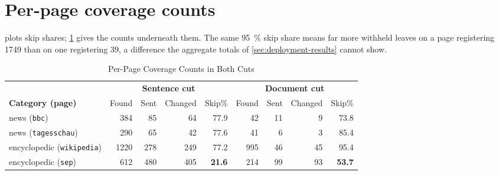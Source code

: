\section{Per-page coverage counts}
\label{app:coverage}

 plots skip shares; \cref{tab:coverage} gives the counts underneath them.
The same \qty{95}{\percent} skip share means far more withheld leaves on a page registering \num{1749} than on one registering 39, a difference the aggregate totals of \cref{sec:deployment-results} cannot show.

\begin{table}[htbp]
	\centering
	\footnotesize
	\setlength{\tabcolsep}{2pt}
	\caption{Per-Page Coverage Counts in Both Cuts}
	\label{tab:coverage}
	\begin{tabular}{@{}l rrrr rrrr@{}}
		\toprule
		                                    & \multicolumn{4}{c}{\textbf{Sentence cut}} & \multicolumn{4}{c}{\textbf{Document cut}}                                                                                                                       \\
		\cmidrule(lr){2-5}\cmidrule(l){6-9}
		\textbf{Category (page)}            & Found                                     & Sent                                      & Changed             & Skip\%              & Found               & Sent         & Changed      & Skip\%              \\
		\midrule
		news (\texttt{bbc})                 & 384                                       & 85                                        & 64                  & \num{77.9}          & 42                  & 11           & 9            & \num{73.8}          \\
		news (\texttt{tagesschau})          & 290                                       & 65                                        & 42                  & \num{77.6}          & 41                  & 6            & 3            & \num{85.4}          \\
		\addlinespace
		encyclopedic (\texttt{wikipedia})   & \num{1220}                                & 278                                       & 249                 & \num{77.2}          & 995                 & 46           & 45           & \num{95.4}          \\
		encyclopedic (\texttt{sep})         & 612                                       & 480                                       & 405                 & \textbf{\num{21.6}} & 214                 & 99           & 93           & \textbf{\num{53.7}} \\

\end{tabular}
\end{table}
